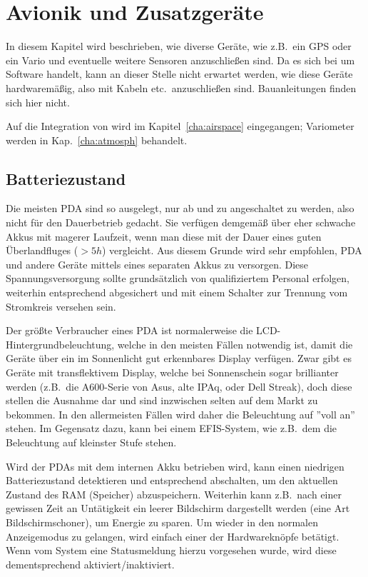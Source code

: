 \chapter{Avionik und Zusatzgeräte}\label{cha:avionics-airframe}

In diesem Kapitel wird beschrieben, wie diverse Geräte, wie z.B.\ ein GPS oder ein Vario und eventuelle weitere Sensoren anzuschließen sind.
\warning  Da es sich bei \xc um Software handelt, kann an dieser Stelle nicht erwartet werden, wie diese Geräte hardwaremäßig, also mit Kabeln etc.\ anzuschließen sind. Bauanleitungen finden sich hier nicht.

Auf die Integration von \fl wird im Kapitel~\ref{cha:airspace}  eingegangen; Variometer werden in Kap.~\ref{cha:atmosph}  behandelt.
\section{Batteriezustand}

Die meisten \textsf{PDA} sind so ausgelegt, nur ab und zu angeschaltet zu werden, also nicht für den Dauerbetrieb gedacht. Sie verfügen demgemäß über eher schwache Akkus mit magerer Laufzeit, wenn man diese mit der Dauer eines guten Überlandfluges  ($>5h$) vergleicht.
Aus diesem Grunde wird sehr empfohlen, \textsf{PDA} und andere Geräte mittels eines separaten Akkus zu versorgen. Diese Spannungsversorgung sollte grundsätzlich von qualifiziertem Personal erfolgen, weiterhin entsprechend abgesichert und mit einem Schalter zur Trennung vom Stromkreis versehen sein.

Der größte Verbraucher eines \textsf{PDA} ist normalerweise die LCD-Hintergrundbeleuchtung, welche in den meisten Fällen notwendig ist, damit die Geräte über ein im Sonnenlicht gut erkennbares Display verfügen. Zwar gibt es Geräte mit transflektivem Display, welche bei Sonnenschein sogar brillianter werden (z.B.\ die A600-Serie von Asus, alte IPAq, oder Dell Streak), doch diese stellen die Ausnahme dar und sind inzwischen selten auf dem Markt zu bekommen.  In den allermeisten Fällen wird daher die Beleuchtung auf ''voll an'' stehen.
Im Gegensatz dazu, kann bei einem EFIS-System, wie z.B.\ dem \al die Beleuchtung auf kleinster Stufe stehen.


Wird der \textsf{PDA}s mit dem internen Akku betrieben wird, kann  \xc einen niedrigen Batteriezustand detektieren und entsprechend abschalten, um den aktuellen Zustand des RAM (Speicher) abzuspeichern. Weiterhin kann z.B.\ nach einer gewissen Zeit an Untätigkeit ein leerer Bildschirm  dargestellt werden (eine Art Bildschirmschoner), um Energie zu sparen.
Um wieder in den normalen  Anzeigemodus zu gelangen, wird einfach einer der Hardwareknöpfe betätigt. Wenn vom System eine Statusmeldung hierzu vorgesehen wurde, wird diese dementsprechend aktiviert/inaktiviert.

